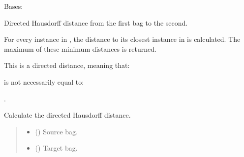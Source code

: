 \documentclass[letterpaper,10pt,english]{sphinxmanual}
\begin{document}
\begin{fulllineitems}
\label{\detokenize{core/index:miml.core.maximal_hausdorff.MaximalHausdorff}}
\pysigstartsignatures
\pysigline
{}
\pysigstopsignatures
\sphinxAtStartPar
Bases: {\hyperref[\detokenize{core/index:miml.core.hausdorff_distance.HausdorffDistance}]{}}

\sphinxAtStartPar
Directed Hausdorff distance from the first bag to the second.

\sphinxAtStartPar
For every instance in , the distance to its closest instance
in  is calculated. The maximum of these minimum distances
is returned.

\sphinxAtStartPar
This is a directed distance, meaning that:

\sphinxAtStartPar
{}

\sphinxAtStartPar
is not necessarily equal to:

\sphinxAtStartPar
{}.

\begin{fulllineitems}
\label{\detokenize{core/index:miml.core.maximal_hausdorff.MaximalHausdorff.distance}}
\pysigstartsignatures
\pysiglinewithargsret
{}
{\sphinxparamcomma {}}
{}
\pysigstopsignatures
\sphinxAtStartPar
Calculate the directed Hausdorff distance.
\begin{quote}\begin{description}
\begin{itemize}
\item {} 
\sphinxAtStartPar
{} ({\hyperref[\detokenize{data/_autosummary/miml.data.bag.Bag:miml.data.bag.Bag}]{}}) \textendash{} Source bag.

\item {} 
\sphinxAtStartPar
{} ({\hyperref[\detokenize{data/_autosummary/miml.data.bag.Bag:miml.data.bag.Bag}]{}}) \textendash{} Target bag.


\end{itemize}
\end{description}
\end{quote}
\end{fulllineitems}
\end{fulllineitems}
\end{document}
